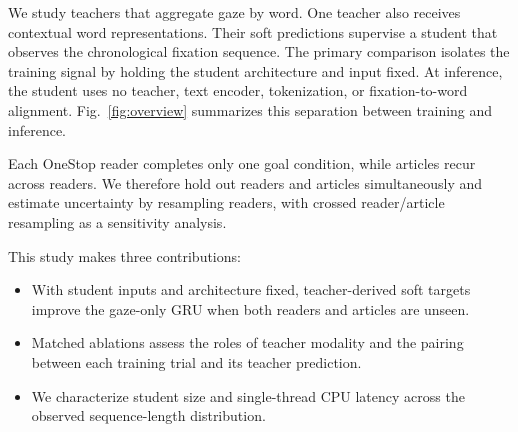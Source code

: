 \documentclass[conference,letterpaper]{IEEEtran}
\begin{document}
We study teachers that aggregate gaze by word.  One teacher also receives
contextual word representations.  Their soft predictions supervise a
student that observes the chronological fixation sequence.  The primary
comparison isolates the training signal by holding the student architecture
and input fixed.  At inference, the student uses no teacher, text encoder,
tokenization, or fixation-to-word alignment.  Fig.~\ref{fig:overview}
summarizes this separation between training and inference.

Each OneStop reader completes only one goal condition, while articles recur
across readers.  We therefore hold out readers and articles simultaneously and
estimate uncertainty by resampling readers, with crossed reader/article
resampling as a sensitivity analysis.

This study makes three contributions:

\begin{itemize}
  \item With student inputs and architecture fixed, teacher-derived soft
  targets improve the gaze-only GRU when both readers and articles are unseen.
  \item Matched ablations assess the roles of teacher modality and the pairing
  between each training trial and its teacher prediction.
  \item We characterize student size and single-thread CPU latency across the
  observed sequence-length distribution.
\end{itemize}
\end{document}
